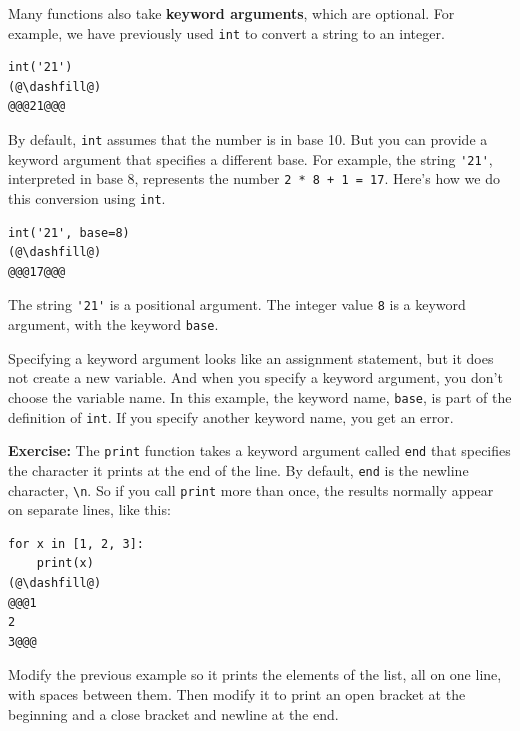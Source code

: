 Many functions also take \textbf{keyword arguments}, which are optional.
For example, we have previously used \passthrough{\lstinline!int!} to
convert a string to an integer.

\begin{lstlisting}[]
int('21')
(@\dashfill@)
@@@21@@@
\end{lstlisting}

By default, \passthrough{\lstinline!int!} assumes that the number is in
base 10. But you can provide a keyword argument that specifies a
different base. For example, the string \passthrough{\lstinline!'21'!},
interpreted in base 8, represents the number
\passthrough{\lstinline!2 * 8 + 1 = 17!}. Here's how we do this
conversion using \passthrough{\lstinline!int!}.

\begin{lstlisting}[]
int('21', base=8)
(@\dashfill@)
@@@17@@@
\end{lstlisting}

The string \passthrough{\lstinline!'21'!} is a positional argument. The
integer value \passthrough{\lstinline!8!} is a keyword argument, with
the keyword \passthrough{\lstinline!base!}.

Specifying a keyword argument looks like an assignment statement, but it
does not create a new variable. And when you specify a keyword argument,
you don't choose the variable name. In this example, the keyword name,
\passthrough{\lstinline!base!}, is part of the definition of
\passthrough{\lstinline!int!}. If you specify another keyword name, you
get an error.

\textbf{Exercise:} The \passthrough{\lstinline!print!} function takes a
keyword argument called \passthrough{\lstinline!end!} that specifies the
character it prints at the end of the line. By default,
\passthrough{\lstinline!end!} is the newline character,
\passthrough{\lstinline!\\n!}. So if you call
\passthrough{\lstinline!print!} more than once, the results normally
appear on separate lines, like this:

\begin{lstlisting}[]
for x in [1, 2, 3]:
    print(x)
(@\dashfill@)
@@@1
2
3@@@
\end{lstlisting}

Modify the previous example so it prints the elements of the list, all
on one line, with spaces between them. Then modify it to print an open
bracket at the beginning and a close bracket and newline at the end.

